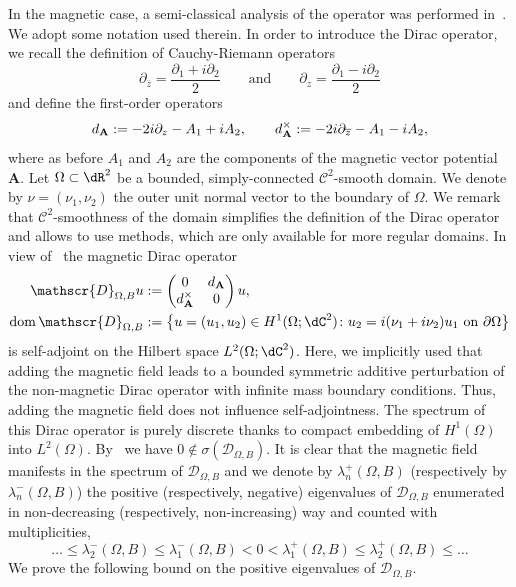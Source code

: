 \documentclass[11pt,a4paper]{amsart}
\newcommand\Omg{\Omega}
\def\p{\partial}
\def\lm{\lambda}
\def\p{\partial}
\numberwithin{figure}{section}
\numberwithin{equation}{section}
\theoremstyle{plain}%
\theoremstyle{remark}
\theoremstyle{plain}
\newcommand\ov{\overline}
\def\ov{\overline}
\newcommand{\dom}{\mathrm{dom}\,}
\begin{document}
In the magnetic case, a semi-classical analysis of the operator was performed in~\cite{BLRS23, LRR24}. We adopt some notation used therein.
In order to introduce the Dirac operator, we recall the definition of
Cauchy-Riemann operators
\begin{equation}\label{def.dz}
	\p_{\ov{z}} = \frac{\p_1+i\p_2}{2}\qquad\text{and}\qquad
	\p_z = \frac{\p_1-i\p_2}{2}
\end{equation}
and define the first-order operators
\begin{equation}\label{def.dA}
	d_{\bf A} := -2i\p_z -  A_1+i  A_2,\qquad
	d_{\bf A}^\times := -2i\p_{\ov{z}} -  A_1-i A_2,
\end{equation}
where as before $A_1$ and $A_2$ are the components of the magnetic vector potential $\mathbf A$. Let $\Omg\subset\dR^2$ be a bounded, simply-connected $\mathscr C^2$-smooth domain. We denote by $\nu = (\nu_1,\nu_2)$ the outer unit normal vector to the boundary of $\Omg$.
We remark that $\mathscr C^2$-smoothness of the domain  simplifies the definition of the Dirac operator
and allows to use methods, which are only available for more regular domains. In view of~\cite[Theorem 1.1]{BFSV17a} 
the magnetic Dirac operator
\begin{equation}
\begin{aligned}
	\mathscr{D}_{\Omega,B} u &:=
	\begin{pmatrix}
	0 & d_{\bf A} \\ d_{\bf A}^\times & 0
	\end{pmatrix}
	u,\\
	\dom\mathscr{D}_{\Omg,B} &:= \big\{u = (u_1,u_2)\in H^1(\Omg;\dC^2)\colon
u_2 = i(\nu_1+i\nu_2) u_1~ {\rm{on}}~\partial \Omega\big\}
\end{aligned}
\end{equation}
is self-adjoint on the Hilbert space $L^2(\Omg;\dC^2)$. 
Here, we implicitly used that adding the magnetic field leads to a bounded symmetric additive perturbation of the non-magnetic Dirac operator with infinite mass boundary conditions. Thus, adding the magnetic field does not influence self-adjointness.
The spectrum of this Dirac operator is purely discrete thanks to compact embedding of $H^1(\Omega)$ into $L^2(\Omega)$.
By~\cite[Proposition 1.5]{BLRS23}
we have $0\notin\sigma(\mathscr{D}_{\Omg,B})$. It is clear that the magnetic field manifests in the spectrum of $\mathscr{D}_{\Omg,B}$ and we  denote by $\lm_n^+(\Omg,B)$ (respectively by $\lm_n^-(\Omg,B)$) the positive (respectively, negative) eigenvalues of $\mathscr D_{\Omg,B}$ enumerated in non-decreasing (respectively, non-increasing) way and counted with multiplicities,
\[
	\dots\le\lm_2^-(\Omg,B)\le \lm_1^-(\Omg,B)< 0 < \lm_1^+(\Omg,B)\le \lm_2^+(\Omg,B)\le \dots
\]
We prove the following bound on the positive eigenvalues of $\mathscr{D}_{\Omega,B}$.
\end{document}
